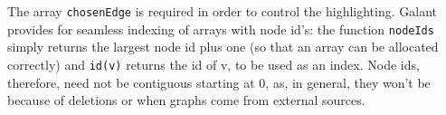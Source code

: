 The array \verb+chosenEdge+ is required in order to control the highlighting.
Galant provides for seamless indexing of arrays with node id's: the
function \verb+nodeIds+ simply returns the largest node id plus one
(so that an array can be allocated correctly) and \verb+id(v)+ returns the
id of v, to be used as an index.
Node ids, therefore, need not be contiguous starting at 0, as,
in general, they won't be because of deletions or when graphs
come from external sources.
